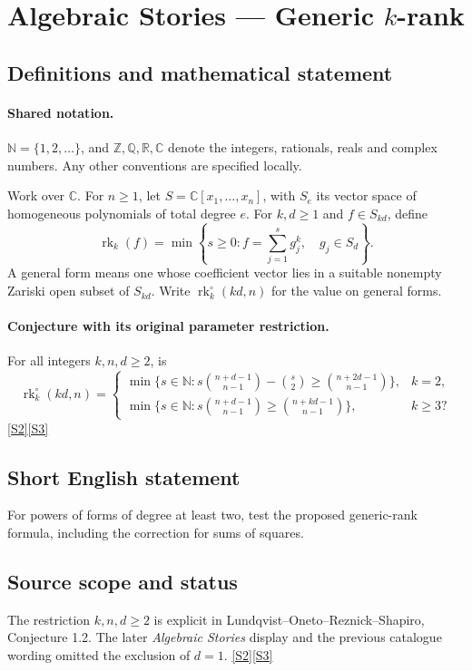 \documentclass[11pt]{article}
\newcommand{\sref}[2]{\hyperlink{source:#1:#2}{[S#2]}}
\begin{document}
\section{Algebraic Stories — Generic $k$-rank}\label{statement}

\subsection{Definitions and mathematical statement}

\paragraph{Shared notation.}$\mathbb N=\{1,2,\ldots\}$, and $\mathbb Z,\mathbb Q,\mathbb R,\mathbb C$ denote the integers, rationals, reals and complex numbers. Any other conventions are specified locally.


Work over $\mathbb C$. For $n\geq1$, let $S=\mathbb C[x_1,\ldots,x_n]$, with $S_e$ its vector space of homogeneous polynomials of total degree $e$. For $k,d\geq1$ and $f\in S_{kd}$, define
\[\operatorname{rk}_k(f)=\min\left\{s\geq0:f=\sum_{j=1}^{s}g_j^k,\quad g_j\in S_d\right\}.
\]
A general form means one whose coefficient vector lies in a suitable nonempty Zariski open subset of $S_{kd}$. Write $\operatorname{rk}_k^\circ(kd,n)$ for the value on general forms.
\paragraph{Conjecture with its original parameter restriction.}
For all integers $k,n,d\geq2$, is
\[
\operatorname{rk}_k^\circ(kd,n)=
\begin{cases}
\min\{s\in\mathbb N:s\binom{n+d-1}{n-1}-\binom{s}{2}\geq\binom{n+2d-1}{n-1}\},&k=2,\\
\min\{s\in\mathbb N:s\binom{n+d-1}{n-1}\geq\binom{n+kd-1}{n-1}\},&k\geq3?
\end{cases}
\] \sref{statement}{2}\sref{statement}{3}
\subsection{Short English statement}
For powers of forms of degree at least two, test the proposed generic-rank formula, including the correction for sums of squares.
\subsection{Source scope and status}
The restriction $k,n,d\geq2$ is explicit in Lundqvist--Oneto--Reznick--Shapiro, Conjecture 1.2. The later \emph{Algebraic Stories} display and the previous catalogue wording omitted the exclusion of $d=1$. \sref{statement}{2}\sref{statement}{3}
\end{document}
